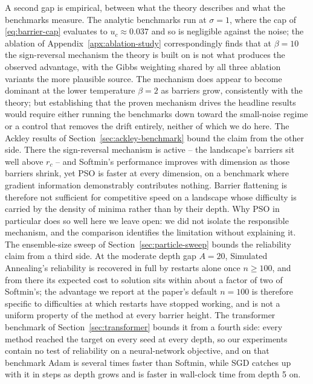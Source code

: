 \documentclass{article} %
\theoremstyle{plain}
\theoremstyle{definition}
\theoremstyle{remark}
\begin{document}
A second gap is empirical, between what the theory describes and what the benchmarks measure. The analytic benchmarks run at $\sigma=1$, where the cap of \eqref{eq:barrier-cap} evaluates to $u_c\approx0.037$ and so is negligible against the noise; the ablation of Appendix~\ref{apx:ablation-study} correspondingly finds that at $\beta=10$ the sign-reversal mechanism the theory is built on is not what produces the observed advantage, with the Gibbs weighting shared by all three ablation variants the more plausible source. The mechanism does appear to become dominant at the lower temperature $\beta=2$ as barriers grow, consistently with the theory; but establishing that the proven mechanism drives the headline results would require either running the benchmarks down toward the small-noise regime or a control that removes the drift entirely, neither of which we do here. The Ackley results of Section~\ref{sec:ackley-benchmark} bound the claim from the other side. There the sign-reversal mechanism is active -- the landscape's barriers sit well above $r_c$ -- and Softmin's performance improves with dimension as those barriers shrink, yet PSO is faster at every dimension, on a benchmark where gradient information demonstrably contributes nothing. Barrier flattening is therefore not sufficient for competitive speed on a landscape whose difficulty is carried by the density of minima rather than by their depth. Why PSO in particular does so well here we leave open: we did not isolate the responsible mechanism, and the comparison identifies the limitation without explaining it. The ensemble-size sweep of Section~\ref{sec:particle-sweep} bounds the reliability claim from a third side. At the moderate depth gap $A=20$, Simulated Annealing's reliability is recovered in full by restarts alone once $n\geq100$, and from there its expected cost to solution sits within about a factor of two of Softmin's; the advantage we report at the paper's default $n=100$ is therefore specific to difficulties at which restarts have stopped working, and is not a uniform property of the method at every barrier height. The transformer benchmark of Section~\ref{sec:transformer} bounds it from a fourth side: every method reached the target on every seed at every depth, so our experiments contain no test of reliability on a neural-network objective, and on that benchmark Adam is several times faster than Softmin, while SGD catches up with it in steps as depth grows and is faster in wall-clock time from depth 5 on.
\end{document}
